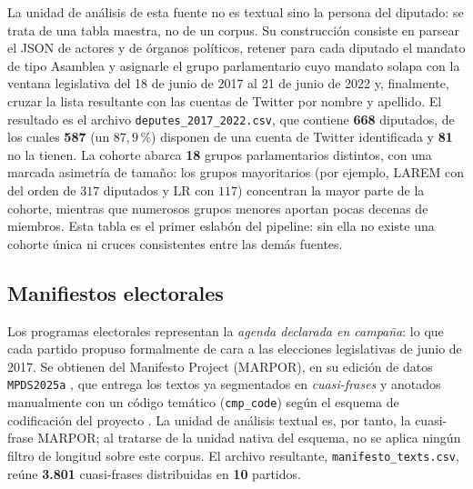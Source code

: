 La unidad de análisis de esta fuente no es textual sino la persona del diputado:
se trata de una tabla maestra, no de un corpus. Su construcción consiste en
parsear el JSON de actores y de órganos políticos, retener para cada diputado el
mandato de tipo Asamblea y asignarle el grupo parlamentario cuyo mandato solapa
con la ventana legislativa del 18 de junio de 2017 al 21 de junio de 2022
y, finalmente, cruzar la lista resultante con las cuentas de Twitter por nombre y
apellido. El resultado es el archivo \texttt{deputes\_2017\_2022.csv}, que
contiene \textbf{668} diputados, de los cuales \textbf{587} (un $87{,}9\,\%$)
disponen de una cuenta de Twitter identificada y \textbf{81} no la tienen. La
cohorte abarca \textbf{18} grupos parlamentarios distintos, con una marcada
asimetría de tamaño: los grupos mayoritarios (por ejemplo, LAREM con del orden de
$317$ diputados y LR con $117$) concentran la mayor parte de la cohorte, mientras
que numerosos grupos menores aportan pocas decenas de miembros. Esta tabla es el
primer eslabón del pipeline: sin ella no existe una cohorte única ni cruces
consistentes entre las demás fuentes.

\subsection{Manifiestos electorales}
\label{sec:corpus-manifestos}

Los programas electorales representan la \emph{agenda declarada en campaña}: lo
que cada partido propuso formalmente de cara a las elecciones legislativas de
junio de 2017. Se obtienen del Manifesto Project (MARPOR), en su edición de datos
\texttt{MPDS2025a} \cite{marpor_mpds2025a}, que entrega los textos ya segmentados
en \emph{cuasi-frases} y anotados manualmente con un código temático
(\texttt{cmp\_code}) según el esquema de codificación del proyecto
\cite{marpor_mp_v5}. La unidad de análisis textual es, por tanto, la cuasi-frase
MARPOR; al tratarse de la unidad nativa del esquema, no se aplica ningún filtro
de longitud sobre este corpus. El archivo resultante,
\texttt{manifesto\_texts.csv}, reúne \textbf{3.801} cuasi-frases distribuidas en
\textbf{10} partidos.

